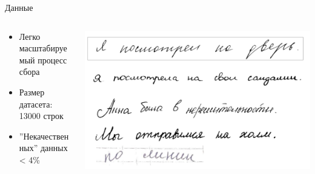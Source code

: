 \documentclass[fleqn, xcolor=x11names]{beamer}
\begin{document}
\begin{frame}{Данные}

    \begin{columns}
        \begin{column}{0.45\textwidth}
            \begin{itemize}
                \item Легко масштабируемый процесс сбора
                \item Размер датасета: 13000 строк
                \item ''Некачественных'' данных < 4\% 
            \end{itemize}
        \end{column}
        \begin{column}{0.55\textwidth}  %
            \centering
            \includegraphics[width=\linewidth]{RHD.png}
        \end{column}
    \end{columns}
\end{frame}
\end{document}
